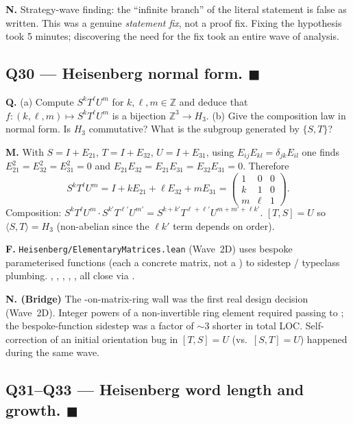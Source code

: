 \documentclass[11pt,a4paper]{article}
\newcommand{\done}[1]{\textcolor{donegreen}{\textbf{#1}}}
\newcommand{\lmod}[1]{\texttt{\small #1}}
\newcommand{\Z}{\mathbb{Z}}
\theoremstyle{plain}
\theoremstyle{definition}
\begin{document}
\textbf{N.} Strategy-wave finding: the ``infinite branch'' of
the literal statement is false as written. This was a genuine
\emph{statement fix}, not a proof fix. Fixing the hypothesis took
5 minutes; discovering the need for the fix took an entire wave
of analysis.

\subsection{Q30 --- Heisenberg normal form. \done{$\blacksquare$}}

\textbf{Q.} (a) Compute $S^k T^\ell U^m$ for $k, \ell, m \in \Z$
and deduce that $f : (k, \ell, m) \mapsto S^k T^\ell U^m$ is a
bijection $\Z^3 \to H_3$. (b) Give the composition law in normal
form. Is $H_3$ commutative? What is the subgroup generated by
$\{S, T\}$?

\textbf{M.} With $S = I + E_{21}$, $T = I + E_{32}$, $U = I + E_{31}$,
using $E_{ij} E_{kl} = \delta_{jk} E_{il}$ one finds $E_{21}^2 =
E_{32}^2 = E_{31}^2 = 0$ and $E_{21}E_{32} = E_{21}E_{31} =
E_{32}E_{31} = 0$. Therefore
\[
S^k T^\ell U^m = I + k E_{21} + \ell E_{32} + m E_{31}
= \begin{pmatrix}1&0&0\\k&1&0\\m&\ell&1\end{pmatrix}.
\]
Composition: $S^k T^\ell U^m \cdot S^{k'} T^{\ell'} U^{m'} =
S^{k+k'} T^{\ell+\ell'} U^{m+m'+\ell k'}$. $[T, S] = U$ so
$\langle S, T\rangle = H_3$ (non-abelian since the $\ell k'$ term
depends on order).

\textbf{F.} \lmod{Heisenberg/ElementaryMatrices.lean} (Wave~2D)
uses bespoke parameterised functions 
(each a concrete matrix, not a ) to sidestep
/ typeclass plumbing.
, , ,
, ,
 all close via
.

\textbf{N. (Bridge)} The -on-matrix-ring wall was the
first real design decision (Wave~2D). Integer powers of a
non-invertible ring element required passing to
\lean{GL$_3(\Z)$}; the bespoke-function sidestep was a factor of
$\sim 3$ shorter in total LOC. Self-correction of an initial
orientation bug in $[T, S] = U$ (vs.\ $[S, T] = U$) happened
during the same wave.

\subsection{Q31--Q33 --- Heisenberg word length and growth. \done{$\blacksquare$}}
\end{document}

